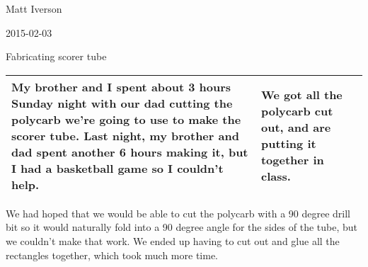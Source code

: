 Matt Iverson

2015-02-03

Fabricating scorer tube

\begin{tabular}{|p{5cm}|p{5cm}|}
 \hline
 My brother and I spent about 3 hours Sunday night with our dad cutting the polycarb we're going to use to make the scorer tube. Last night, my brother and dad spent another 6 hours making it, but I had a basketball game so I couldn't help.
&
 We got all the polycarb cut out, and are putting it together in class.
\\
 \hline
\end{tabular}

We had hoped that we would be able to cut the polycarb with a 90 degree drill bit so it would naturally fold into a 90 degree angle for the sides of the tube, but we couldn't make that work. We ended up having to cut out and glue all the rectangles together, which took much more time. 
